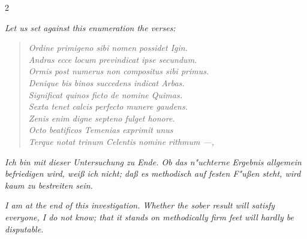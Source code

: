 \documentclass[10pt,a4paper]{article}
\begin{document}
\begin{paracol}{2}
\switchcolumn

\textit{Let us set against this enumeration the verses:}

\begin{quote}
\textit{Ordine primigeno sibi nomen possidet Igin.}\\
\textit{Andras ecce locum previndicat ipse secundum.}\\
\textit{Ormis post numerus non compositus sibi primus.}\\
\textit{Denique bis binos succedens indicat Arbas.}\\
\textit{Significat quinos ficto de nomine Quimas.}\\
\textit{Sexta tenet calcis perfecto munere gaudens.}\\
\textit{Zenis enim digne septeno fulget honore.}\\
\textit{Octo beatificos Temenias exprimit unus}\\
\textit{Terque notat trinum Celentis nomine rithmum ---,}
\end{quote}

\switchcolumn*

\textit{Ich bin mit dieser Untersuchung zu Ende. Ob das n"uchterne Ergebnis allgemein befriedigen wird, wei\ss{} ich nicht; da\ss{} es methodisch auf festen F"u\ss{}en steht, wird kaum zu bestreiten sein.}

\switchcolumn

\textit{I am at the end of this investigation. Whether the sober result will satisfy everyone, I do not know; that it stands on methodically firm feet will hardly be disputable.}

\end{paracol}

\clearpage
\end{document}
